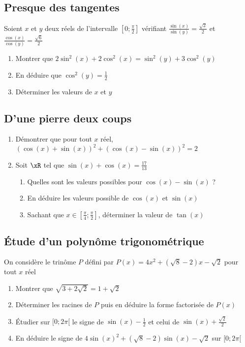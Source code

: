 \documentclass[oneside,12pt]{book}          %
\begin{document}
\subsection{Presque des tangentes}
Soient $x$ et $y$ deux réels de l'intervalle $\left[0;\frac{\pi}{2}\right]$ vérifiant $\frac{\sin(x)}{\sin(y)}=\frac{\sqrt{2}}{2}$ et $\frac{\cos(x)}{\cos(y)}=\frac{\sqrt{6}}{2}$
\begin{enumerate}
    \item Montrer que $2\sin^2(x)+2\cos^2(x)=\sin^2(y)+3\cos^2(y)$
    \item En déduire que $\cos^2(y)=\frac{1}{2}$
    \item Déterminer les valeurs de $x$ et $y$
\end{enumerate}



\subsection{D'une pierre deux coups}
\begin{enumerate}
    \item Démontrer que pour tout $x$ réel, $(\cos(x)+\sin(x))^2+(\cos(x)-\sin(x))^2=2$
    \item Soit $\xR$ tel que $\sin(x)+\cos(x)=\frac{17}{13}$
    \begin{enumerate}
        \item Quelles sont les valeurs possibles pour $\cos(x)-\sin(x)$ ?
        \item En déduire les valeurs possible de $\cos(x)$ et $\sin(x)$
        \item Sachant que $x\in\left[\frac{\pi}{4};\frac{\pi}{2}\right]$, déterminer la valeur de $\tan(x)$
    \end{enumerate}
\end{enumerate}



\subsection{Étude d'un polynôme trigonométrique}
On considère le trinôme $P$ défini par $P(x)=4x^2+(\sqrt{8}-2)x-\sqrt{2}$ pour tout $x$ réel
\begin{enumerate}
    \item Montrer que $\sqrt{3+2\sqrt{2}}=1+\sqrt{2}$
    \item Déterminer les racines de $P$ puis en déduire la forme factorisée de $P(x)$
    \item Étudier sur $[0;2\pi[$ le signe de $\sin(x)-\frac{1}{2}$ et celui de $\sin(x)+\frac{\sqrt{2}}{2}$
    \item En déduire le signe de $4\sin(x)^2+(\sqrt{8}-2)\sin(x)-\sqrt{2}$ sur $[0;2\pi[$
\end{enumerate}
\end{document}
